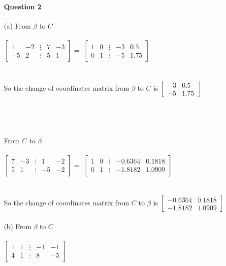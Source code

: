 \documentclass{article}
\begin{document}
\\\\\\
\noindent\textbf{Question 2}\\\\
\indent(a)\indent
\space From $\beta$ to $C$
\\\\
\indent\indent\indent$\begin{bmatrix}1&-2&\vdots&7&-3\\-5&2&\vdots&5&1\end{bmatrix} =$
$ \begin{bmatrix}1&0&\vdots&-3&0.5\\0&1&\vdots&-5&1.75\end{bmatrix}$
\\\\\\
\indent\indent\indent So the change of coordinates matrix from $\beta$ to $C$ is $ \begin{bmatrix}-3&0.5\\-5&1.75\end{bmatrix}$
\\\\\\\\\\
\indent\indent\indent From $C$ to $\beta$
\\\\
\indent\indent\indent$\begin{bmatrix}7&-3&\vdots&1&-2\\5&1&\vdots&-5&-2\end{bmatrix} =$
$ \begin{bmatrix}1&0&\vdots&-0.6364&0.1818\\0&1&\vdots&-1.8182&1.0909\end{bmatrix}$
\\\\\\
\indent\indent\indent So the change of coordinates matrix from $C$ to $\beta$ is $ \begin{bmatrix}-0.6364&0.1818\\-1.8182&1.0909\end{bmatrix}$
\\\\
\indent(b)\indent
\space From $\beta$ to $C$
\\\\
\indent\indent\indent$\begin{bmatrix}1&1&\vdots&-1&-1\\4&1&\vdots&8&-5\end{bmatrix} =$
\end{document}
